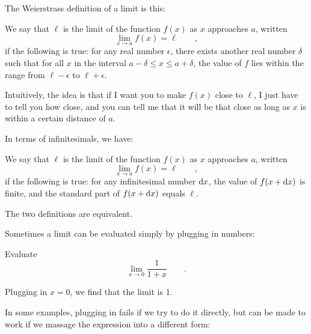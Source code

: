 The Weierstrass definition of a limit is this:
\begin{important}
We say that $\ell$ is the limit of the function $f(x)$ as $x$ approaches $a$, written
\begin{equation*}
  \lim_{x\rightarrow a} f(x) = \ell \qquad ,
\end{equation*}
if the following is true: for any real number $\epsilon$, there exists another real number
$\delta$ such that for all $x$ in the interval $a-\delta\le x \le a+\delta$,
the value of $f$ lies within the range from $\ell-\epsilon$ to $\ell+\epsilon$.
\end{important}
Intuitively, the idea is that if I want you to make $f(x)$ close to $\ell$, I just have
to tell you how close, and you can tell me that it will be that close as long as
$x$ is within a certain distance of $a$.

In terms of infinitesimals, we have:
\begin{important}
We say that $\ell$ is the limit of the function $f(x)$ as $x$ approaches $a$, written
\begin{equation*}
  \lim_{x\rightarrow a} f(x) = \ell \qquad ,
\end{equation*}
if the following is true: for any infinitesimal number $\textup{d} x$, 
the value of $f(x+\textup{d} x)$ is finite, and the standard
part of $f(x+\textup{d} x)$ equals $\ell$.
\end{important}

The two definitions are equivalent.

Sometimes a limit can be evaluated simply by plugging in numbers:

\begin{eg}
\egquestion Evaluate
\begin{equation*}
  \lim_{x\rightarrow 0} \frac{1}{1+x} \qquad .
\end{equation*}

\eganswer Plugging in $x=0$, we find that the limit is 1.
\end{eg}

In some examples, plugging in fails if we try to do it directly, but
can be made to work if we massage the expression into a different form:

